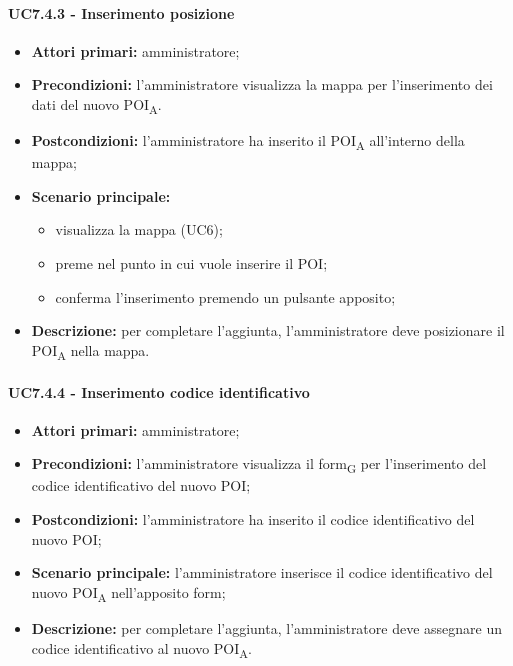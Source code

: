 \paragraph{UC7.4.3 - Inserimento posizione}
\begin{itemize}
	\item 	\textbf{Attori primari:} amministratore;
	\item 	\textbf{Precondizioni:} l'amministratore visualizza la mappa per l'inserimento dei dati del nuovo \acrshort{POI}\textsubscript{A}.
	\item 	\textbf{Postcondizioni:} l'amministratore ha inserito il \acrshort{POI}\textsubscript{A} all'interno della mappa; 
	\item 	\textbf{Scenario principale:}
	\begin{itemize}
		\item visualizza la mappa (UC6);
		\item preme nel punto in cui vuole inserire il POI;
		\item conferma l'inserimento premendo un pulsante apposito;
	\end{itemize}
	\item 	\textbf{Descrizione:} per completare l'aggiunta, l'amministratore deve posizionare il \acrshort{POI}\textsubscript{A} nella mappa.

\end{itemize}

\paragraph{UC7.4.4 - Inserimento codice identificativo}
\begin{itemize}
	\item 	\textbf{Attori primari:} amministratore;
	\item 	\textbf{Precondizioni:} l'amministratore visualizza il \gls{form}\textsubscript{G} per l'inserimento del codice identificativo del nuovo POI;
	\item 	\textbf{Postcondizioni:} l'amministratore ha inserito il codice identificativo del nuovo POI; 
	\item 	\textbf{Scenario principale:} l'amministratore inserisce il codice identificativo del nuovo \acrshort{POI}\textsubscript{A} nell'apposito form;
	\item 	\textbf{Descrizione:} per completare l'aggiunta, l'amministratore deve assegnare un codice identificativo al nuovo \acrshort{POI}\textsubscript{A}.

\end{itemize}


